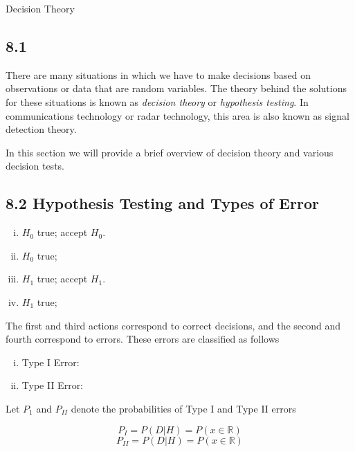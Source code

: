 


Decision Theory

\subsection*{8.1}

There are many situations in which we have to make decisions based on observations or data
that are random variables.
The theory behind the solutions for these situations is known as \textit{decision theory}
or \textit{hypothesis testing}.
In communications technology or radar technology, this area is also known as signal detection theory.

In this section we will provide a brief overview of decision theory and various decision tests.

\subsection*{8.2 Hypothesis Testing and Types of Error}


\begin{enumerate}[(i)]
\item $H_0$ true; accept $H_0$. 
\item $H_0$ true; 
\item $H_1$ true; accept $H_1$. 
\item $H_1$ true; 
\end{enumerate}


The first and third actions correspond to correct decisions, and the second and fourth correspond to errors.
These errors are classified as follows

\begin{enumerate}[(i)]
\item Type I Error:
\item Type II Error: 
\end{enumerate}

Let $P_{1}$ and $P_{II}$ denote the probabilities of Type I and Type II errors

\[ P_{I} = P(D|H) = P(x \in \mathbb{R}) \]
\[ P_{II} = P(D|H) = P(x \in \mathbb{R}) \]

